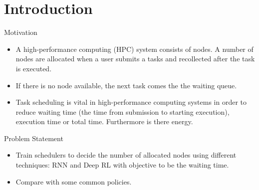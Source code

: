 \section{Introduction}

\begin{frame}{Motivation}
    \begin{itemize}
        \item A high-performance computing (HPC) system consists of nodes. A number of nodes are allocated when a user submits a tasks and recollected after the task is executed.
        \item If there is no node available, the next task comes the the waiting queue.
        \item Task scheduling is vital in high-performance computing systems in order to reduce waiting time (the time from submission to starting execution), execution time or total time. Furthermore is there energy.
    \end{itemize}
\end{frame}

\begin{frame}{Problem Statement}
    \begin{itemize}
        \item Train schedulers to decide the number of allocated nodes using different techniques: RNN and Deep RL with objective to be the waiting time.
        \item Compare with some common policies.
    \end{itemize}
\end{frame}